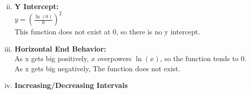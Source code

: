 \documentclass{letter}
\begin{document}
	\begin{minipage}[t]{0.5\textwidth}
		\begin{enumerate}[i)]
			\setcounter{enumi}{1}
			\item \textbf{Y Intercept:}\\
			$y = (\frac{\ln(0)}{0})^2$\\
			This function does not exist at 0, so there is no y intercept.\\
			\setcounter{enumi}{3}
			\item \textbf{Horizontal End Behavior:}\\
			As x gets big positively, $x$ overpowers $\ln(x)$, so the function tends to 0.\\
			As x gets big negatively, The function does not exist.\\
			\setcounter{enumi}{5}
			\item \textbf{Increasing/Decreasing Intervals}\\
			

\end{enumerate}
\end{minipage}
\end{document}

